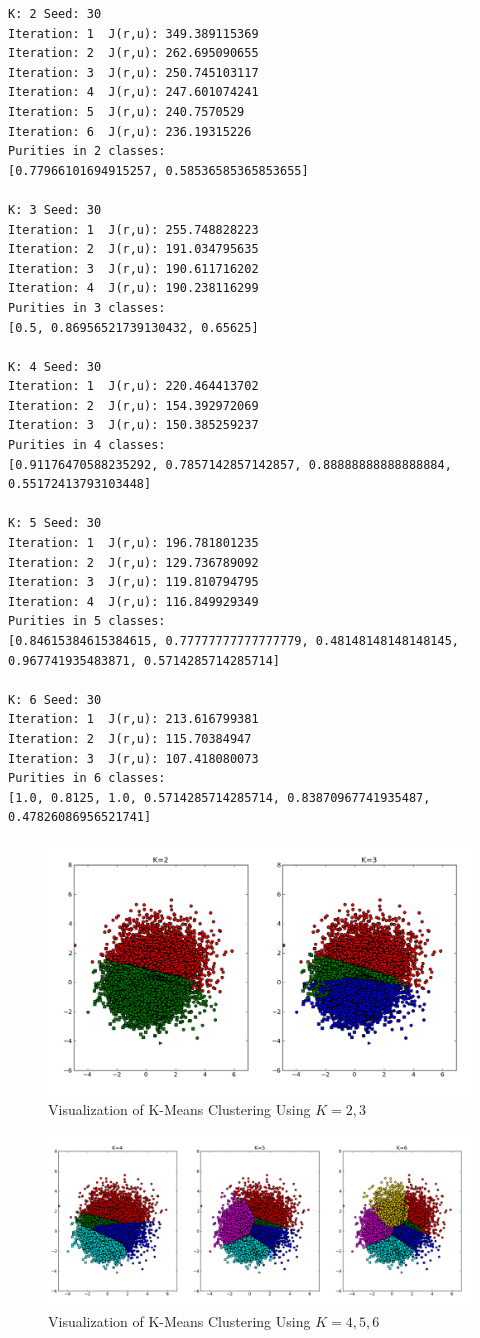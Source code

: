 \begin{itemize}
\begin{verbatim}
K: 2 Seed: 30
Iteration: 1  J(r,u): 349.389115369
Iteration: 2  J(r,u): 262.695090655
Iteration: 3  J(r,u): 250.745103117
Iteration: 4  J(r,u): 247.601074241
Iteration: 5  J(r,u): 240.7570529
Iteration: 6  J(r,u): 236.19315226
Purities in 2 classes: 
[0.77966101694915257, 0.58536585365853655]

K: 3 Seed: 30
Iteration: 1  J(r,u): 255.748828223
Iteration: 2  J(r,u): 191.034795635
Iteration: 3  J(r,u): 190.611716202
Iteration: 4  J(r,u): 190.238116299
Purities in 3 classes: 
[0.5, 0.86956521739130432, 0.65625]

K: 4 Seed: 30
Iteration: 1  J(r,u): 220.464413702
Iteration: 2  J(r,u): 154.392972069
Iteration: 3  J(r,u): 150.385259237
Purities in 4 classes: 
[0.91176470588235292, 0.7857142857142857, 0.88888888888888884, 0.55172413793103448]

K: 5 Seed: 30
Iteration: 1  J(r,u): 196.781801235
Iteration: 2  J(r,u): 129.736789092
Iteration: 3  J(r,u): 119.810794795
Iteration: 4  J(r,u): 116.849929349
Purities in 5 classes: 
[0.84615384615384615, 0.77777777777777779, 0.48148148148148145, 0.967741935483871, 0.5714285714285714]

K: 6 Seed: 30
Iteration: 1  J(r,u): 213.616799381
Iteration: 2  J(r,u): 115.70384947
Iteration: 3  J(r,u): 107.418080073
Purities in 6 classes: 
[1.0, 0.8125, 1.0, 0.5714285714285714, 0.83870967741935487, 0.47826086956521741]

\end{verbatim}

\begin{figure}[htb]
\centering
\includegraphics[width=12cm]{F21.png}
\caption{Visualization of K-Means Clustering Using $K=2,3$}
\label{F21}
\end{figure}

\begin{figure}[htb]
\centering
\includegraphics[width=18cm]{F22.png}
\caption{Visualization of K-Means Clustering Using $K=4,5,6$}
\label{F22}
\end{figure}


\end{itemize}
